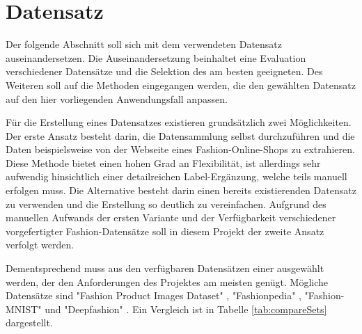 \section{Datensatz} \label{sec:data_set}

Der folgende Abschnitt soll sich mit dem verwendeten Datensatz auseinandersetzen. Die Auseinandersetzung beinhaltet eine Evaluation verschiedener Datensätze und die Selektion des am besten geeigneten. Des Weiteren soll auf die Methoden eingegangen werden, die den gewählten Datensatz auf den hier vorliegenden Anwendungsfall anpassen.

Für die Erstellung eines Datensatzes existieren grundsätzlich zwei Möglichkeiten. Der erste Ansatz besteht darin, die Datensammlung selbst durchzuführen und die Daten beispielsweise von der Webseite eines Fashion-Online-Shops zu extrahieren. Diese Methode bietet einen hohen Grad an Flexibilität, ist allerdings sehr aufwendig hinsichtlich einer detailreichen Label-Ergänzung, welche teils manuell erfolgen muss. Die Alternative besteht darin einen bereits existierenden Datensatz zu verwenden und die Erstellung so deutlich zu vereinfachen. Aufgrund des manuellen Aufwands der ersten Variante und der Verfügbarkeit verschiedener vorgefertigter Fashion-Datensätze soll in diesem Projekt der zweite Ansatz verfolgt werden.

Dementsprechend muss aus den verfügbaren Datensätzen einer ausgewählt werden, der den Anforderungen des Projektes am meisten genügt. Mögliche Datensätze sind "Fashion Product Images Dataset" \cite{FashionProduct2019}, "Fashionpedia" \cite{Fashionpedia2020}, "Fashion-MNIST" \cite{FashionMNIST2017} und "Deepfashion" \cite{DeepFashion2016}. Ein Vergleich ist in Tabelle \ref{tab:compareSets} dargestellt. 

